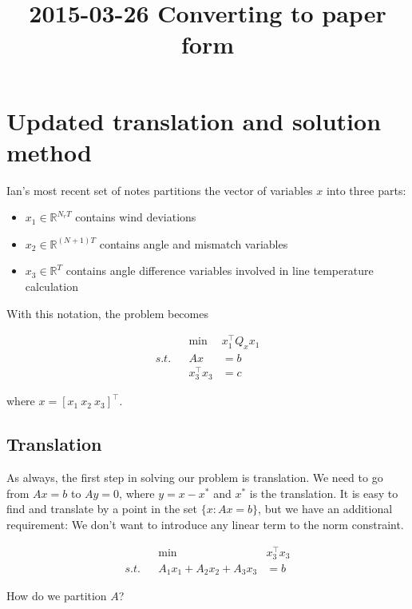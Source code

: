 \documentclass{article}
\title{2015-03-26 Converting to paper form}
\begin{document}
    
    
    \maketitle
    
    

    
    \section{Updated translation and solution
method}\label{updated-translation-and-solution-method}

    Ian's most recent set of notes partitions the vector of variables $x$
into three parts:

\begin{itemize}
\item
  $x_1\in\mathbb{R}^{N_rT}$ contains wind deviations
\item
  $x_2\in\mathbb{R}^{(N+1)T}$ contains angle and mismatch variables
\item
  $x_3\in\mathbb{R}^T$ contains angle difference variables involved in
  line temperature calculation
\end{itemize}

With this notation, the problem becomes

\begin{align}
&& \min~ & x_1^\top Q_x x_1 \\
s.t. && Ax &= b \\
&& x_3^\top x_3 &= c
\end{align}

where $x=[x_1~x_2~x_3]^\top$.

\subsection{Translation}\label{translation}

As always, the first step in solving our problem is translation. We need
to go from $Ax=b$ to $Ay=0$, where $y=x-x^*$ and $x^*$ is the
translation. It is easy to find and translate by a point in the set
$\{x:Ax=b\}$, but we have an additional requirement: We don't want to
introduce any linear term to the norm constraint.

\begin{align}
&& \min~ & x_3^\top x_3 \\
s.t. && A_1x_1 + A_2x_2 + A_3x_3 &= b
\end{align}

    How do we partition $A$?
\end{document}
